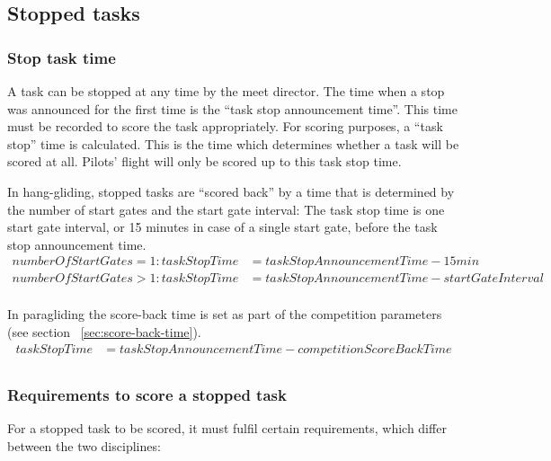 \documentclass{article}
\begin{document}
\subsection{Stopped tasks}
\label{sec:stopped-tasks}
\subsubsection{Stop task time}
\label{sec:stop-task-time}
A task can be stopped at any time by the meet director. The time when a stop
was announced for the first time is the “task stop announcement time”. This
time must be recorded to score the task appropriately. For scoring purposes,
a “task stop” time is calculated. This is the time which determines whether
a task will be scored at all. Pilots’ flight will only be scored up to this
task stop time.

\begin{hg}
In hang-gliding, stopped tasks are “scored back” by a time that is determined
by the number of start gates and the start gate interval: The task stop time is
one start gate interval, or 15 minutes in case of a single start gate, before
the task stop announcement time.
\begin{align*}
    numberOfStartGates = 1 : taskStopTime &= taskStopAnnouncementTime - 15min \\
    numberOfStartGates > 1 : taskStopTime &= taskStopAnnouncementTime - startGateInterval \\
\end{align*}
\end{hg}

\begin{pg}
In paragliding the score-back time is set as part of the competition parameters
(see section ~\ref{sec:score-back-time}).
\begin{align*}
    taskStopTime &= taskStopAnnouncementTime - competitionScoreBackTime \\
\end{align*}
\end{pg}

\subsubsection{Requirements to score a stopped task}
For a stopped task to be scored, it must fulfil certain requirements, which
differ between the two disciplines:
\end{document}
